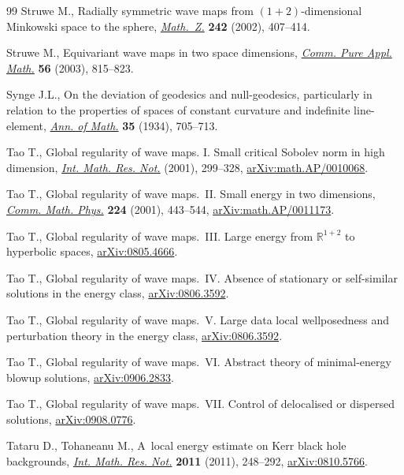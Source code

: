 \documentclass[pdftex]{sigma}
\numberwithin{equation}{section}
\begin{document}
\begin{thebibliography}{99}
Struwe M., Radially symmetric wave maps from {$(1+2)$}-dimensional {M}inkowski
 space to the sphere,
 \href{https://doi.org/10.1007/s002090100345}{\textit{Math.~Z.}} \textbf{242}
 (2002), 407--414.

Struwe M., Equivariant wave maps in two space dimensions,
 \href{https://doi.org/10.1002/cpa.10074}{\textit{Comm. Pure Appl. Math.}}
 \textbf{56} (2003), 815--823.

Synge J.L., On the deviation of geodesics and null-geodesics, particularly in
 relation to the properties of spaces of constant curvature and indefinite
 line-element, \href{https://doi.org/10.2307/1968486}{\textit{Ann. of Math.}}
 \textbf{35} (1934), 705--713.

Tao T., Global regularity of wave maps. {I}. {S}mall critical {S}obolev norm in
 high dimension, \href{https://doi.org/10.1155/S1073792801000150}{\textit{Int.
 Math. Res. Not.}} (2001), 299--328,
 \href{http://arxiv.org/abs/math.AP/0010068}{arXiv:math.AP/0010068}.

Tao T., Global regularity of wave maps.~{II}. {S}mall energy in two dimensions,
 \href{https://doi.org/10.1007/PL00005588}{\textit{Comm. Math. Phys.}}
 \textbf{224} (2001), 443--544,
 \href{http://arxiv.org/abs/math.AP/0011173}{arXiv:math.AP/0011173}.

Tao T., Global regularity of wave maps.~{III}. {L}arge energy from
 $\mathbb{R}^{1+2}$ to hyperbolic spaces,
 \href{http://arxiv.org/abs/0805.4666}{arXiv:0805.4666}.

Tao T., Global regularity of wave maps.~{IV}. {A}bsence of stationary or
 self-similar solutions in the energy class,
 \href{http://arxiv.org/abs/0806.3592}{arXiv:0806.3592}.

Tao T., Global regularity of wave maps.~{V}. {L}arge data local wellposedness
 and perturbation theory in the energy class,
 \href{http://arxiv.org/abs/0806.3592}{arXiv:0806.3592}.

Tao T., Global regularity of wave maps.~{VI}. {A}bstract theory of
 minimal-energy blowup solutions,
 \href{http://arxiv.org/abs/0906.2833}{arXiv:0906.2833}.

Tao T., Global regularity of wave maps.~{VII}. {C}ontrol of delocalised or
 dispersed solutions, \href{http://arxiv.org/abs/0908.0776}{arXiv:0908.0776}.

Tataru D., Tohaneanu M., A~local energy estimate on {K}err black hole
 backgrounds, \href{https://doi.org/10.1093/imrn/rnq069}{\textit{Int. Math.
 Res. Not.}} \textbf{2011} (2011), 248--292,
 \href{http://arxiv.org/abs/0810.5766}{arXiv:0810.5766}.


\end{thebibliography}
\end{document}
